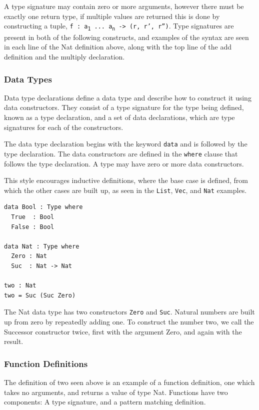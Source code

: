 \documentclass[a4paper]{article}
\begin{document}
A type signature may contain zero or more arguments,
however there must be exactly one return type, if multiple values are 
returned this is done by constructing a tuple,
\texttt{f : a\textsubscript{1} ... a\textsubscript{n} -> (r, r', r'')}. Type signatures are present in both
of the following constructs, and examples of the syntax are seen in each line of the Nat definition above, along
with the top line of the add definition and the multiply declaration.

\subsubsection{Data Types}
\label{sec:orga233947}
Data type declarations define a data type and describe how to construct it using data constructors.
They consist of a type signature for the type being 
defined, known as a type declaration, and a set of data declarations, 
which are type signatures for each of the constructors.

The data type declaration begins with the keyword \texttt{data} and is followed by 
the type declaration. The data constructors are defined in the \texttt{where} 
clause that follows the type declaration. A type may have zero or more
data constructors. 

This style encourages inductive definitions, where the base case is 
defined, from which the other cases are built up, as seen in the \texttt{List},
\texttt{Vec}, and \texttt{Nat} examples.

\begin{center}
\begin{verbatim}
data Bool : Type where
  True  : Bool
  False : Bool

data Nat : Type where
  Zero : Nat
  Suc  : Nat -> Nat

two : Nat
two = Suc (Suc Zero)
\end{verbatim}
\end{center}

The Nat data type has two constructors \texttt{Zero} and \texttt{Suc}. Natural numbers are built
up from zero by repeatedly adding one. To construct the number two, we call the Successor
constructor twice, first with the argument Zero, and again with the result.

\clearpage

\subsubsection{Function Definitions}
\label{sec:org19c74b8}
The definition of two seen above is an example of a function definition, one which takes no arguments,
and returns a value of type Nat. Functions have two components: 
A type signature, and a pattern matching definition.
\end{document}
